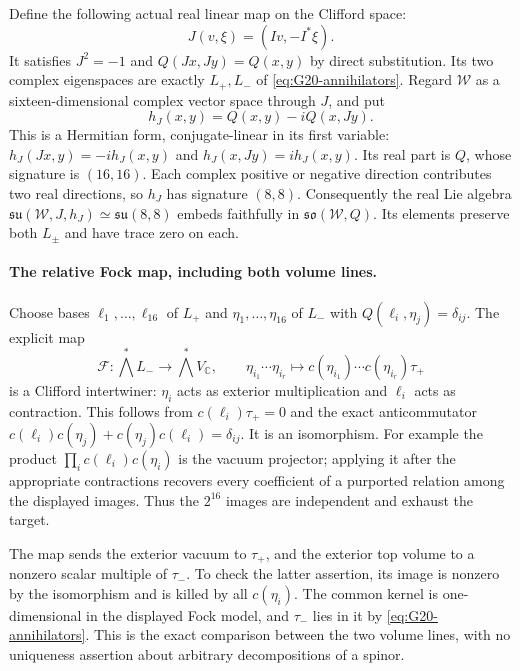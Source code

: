 Define the following actual real linear map on the Clifford space:
\begin{equation}\label{eq:G20-J}
       J(v,\xi)=(Iv,-I^*\xi).
\end{equation}
It satisfies \(J^2=-1\) and \(Q(Jx,Jy)=Q(x,y)\) by direct
substitution. Its two complex eigenspaces are exactly
\(L_+,L_-\) of \eqref{eq:G20-annihilators}. Regard \(\mathcal W\)
as a sixteen-dimensional complex vector space through \(J\), and put
\[
              h_J(x,y)=Q(x,y)-iQ(x,Jy).
\]
This is a Hermitian form, conjugate-linear in its first variable:
\(h_J(Jx,y)=-ih_J(x,y)\) and
\(h_J(x,Jy)=ih_J(x,y)\). Its real part is \(Q\), whose signature
is \((16,16)\). Each complex positive or negative direction
contributes two real directions, so \(h_J\) has signature \((8,8)\).
Consequently the real Lie algebra
\(\mathfrak{su}(\mathcal W,J,h_J)\simeq\mathfrak{su}(8,8)\)
embeds faithfully in \(\mathfrak{so}(\mathcal W,Q)\). Its elements
preserve both \(L_\pm\) and have trace zero on each.

\paragraph{The relative Fock map, including both volume lines.}
Choose bases \(\ell_1,\ldots,\ell_{16}\) of \(L_+\) and
\(\eta_1,\ldots,\eta_{16}\) of \(L_-\) with
\(Q(\ell_i,\eta_j)=\delta_{ij}\). The explicit map
\begin{equation}\label{eq:G20-Fock}
 \mathcal F:\bigwedge^*L_-\longrightarrow\bigwedge^*V_{\mathbb C},
 \qquad
 \eta_{i_1}\cdots\eta_{i_r}\longmapsto
 c(\eta_{i_1})\cdots c(\eta_{i_r})\tau_+
\end{equation}
is a Clifford intertwiner: \(\eta_i\) acts as exterior multiplication
and \(\ell_i\) acts as contraction. This follows from
\(c(\ell_i)\tau_+=0\) and the exact anticommutator
\(c(\ell_i)c(\eta_j)+c(\eta_j)c(\ell_i)=\delta_{ij}\).
It is an isomorphism. For example the product
\(\prod_i c(\ell_i)c(\eta_i)\) is the vacuum projector;
applying it after the appropriate contractions recovers every
coefficient of a purported relation among the displayed images.
Thus the \(2^{16}\) images are independent and exhaust the target.

The map sends the exterior vacuum to \(\tau_+\), and the exterior
top volume to a nonzero scalar multiple of \(\tau_-\). To check
the latter assertion, its image is nonzero by the isomorphism and is
killed by all \(c(\eta_i)\). The common kernel is one-dimensional
in the displayed Fock model, and \(\tau_-\) lies in it by
\eqref{eq:G20-annihilators}. This is the exact comparison between
the two volume lines, with no uniqueness assertion about arbitrary
decompositions of a spinor.

